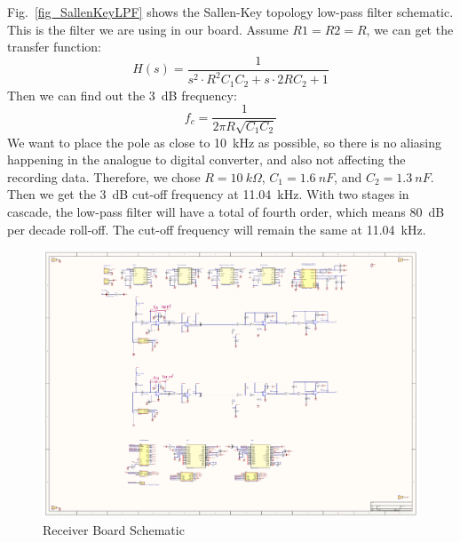 Fig.~\ref{fig_SallenKeyLPF} shows the Sallen-Key topology low-pass filter schematic.  This is the filter we are using in our board.  Assume $R1=R2=R$, we can get the transfer function:
$$H(s) = \frac{1}{s^2 \cdot R^2 C_1 C_2 + s \cdot 2R C_2 + 1}$$
Then we can find out the \qty{3}{dB} frequency:
$$f_c = \frac{1}{2\pi R \sqrt{C_1 C_2}}$$
We want to place the pole as close to \qty{10}{kHz} as possible, so there is no aliasing happening in the analogue to digital converter, and also not affecting the recording data.  Therefore, we chose $R=\qty{10}{k\Omega}$, $C_1=\qty{1.6}{nF}$, and $C_2=\qty{1.3}{nF}$.  Then we get the \qty{3}{dB} cut-off frequency at \qty{11.04}{kHz}.  With two stages in cascade, the low-pass filter will have a total of fourth order, which means \qty{80}{dB} per decade roll-off.  The cut-off frequency will remain the same at \qty{11.04}{kHz}.

\begin{figure}[H]
\centering
\includegraphics[width=1\linewidth]{4-ANC_Sys/ReceiverAmplifierBoardSchematic_23_5_2023.pdf}
\caption{Receiver Board Schematic}
\label{fig_sch}
\end{figure}

